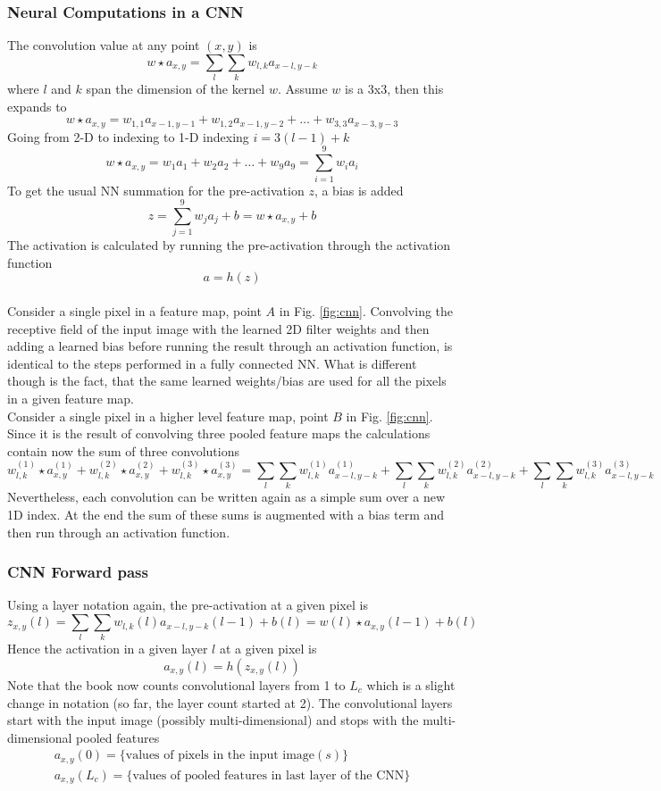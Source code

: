 \subsubsection{Neural Computations in a CNN}
The convolution value at any point $(x,y)$ is
\[
  w \star a_{x,y} = \sum_l \sum_k w_{l,k} a_{x-l,y-k}
\]
where $l$ and $k$ span the dimension of the kernel $w$.
Assume $w$ is a 3x3, then this expands to
\[
  w \star a_{x,y} = w_{1,1}a_{x-1,y-1} + w_{1,2}a_{x-1,y-2} + \ldots + w_{3,3}a_{x-3,y-3}
\]
Going from 2-D to indexing to 1-D indexing $i=3(l-1)+k$
\[
  w \star a_{x,y} = w_1a_1 + w_2a_2 + \ldots + w_9a_9 = \sum_{i=1}^{9} w_ia_i
\]
To get the usual NN summation for the pre-activation $z$, a bias is added
\[
  z = \sum_{j=1}^{9} w_ja_j + b = w \star a_{x,y} + b
\]
The activation is calculated by running the pre-activation through the activation function
\[
  a = h(z)
\]
\\

Consider a single pixel in a feature map, point $A$ in Fig. \ref{fig:cnn}.
Convolving the receptive field of the input image with the learned 2D filter weights and then adding a learned bias before running the result through an activation function, is identical to the steps performed in a fully connected NN.
What is different though is the fact, that the same learned weights/bias are used for all the pixels in a given feature map.\\

Consider a single pixel in a higher level feature map, point $B$ in Fig. \ref{fig:cnn}.
Since it is the result of convolving three pooled feature maps the calculations contain now the sum of three convolutions
\[
  w_{l,k}^{(1)} \star a_{x,y}^{(1)} + w_{l,k}^{(2)} \star a_{x,y}^{(2)} + w_{l,k}^{(3)} \star a_{x,y}^{(3)} = \sum_l \sum_k w_{l,k}^{(1)}a_{x-l,y-k}^{(1)} + \sum_l \sum_k w_{l,k}^{(2)}a_{x-l,y-k}^{(2)} + \sum_l \sum_k w_{l,k}^{(3)}a_{x-l,y-k}^{(3)}
\]
Nevertheless, each convolution can be written again as a simple sum over a new 1D index.
At the end the sum of these sums is augmented with a bias term and then run through an activation function.

\subsubsection{CNN Forward pass}
Using a layer notation again, the pre-activation at a given pixel is
\[
  z_{x,y}(l) = \sum_l \sum_k w_{l,k}(l) a_{x-l,y-k}(l-1) + b(l) = w(l) \star a_{x,y}(l-1) + b(l)
\]
Hence the activation in a given layer $l$ at a given pixel is
\[
  a_{x,y}(l) = h(z_{x,y}(l))
\]
Note that the book now counts convolutional layers from 1 to $L_c$ which is a slight change in notation (so far, the layer count started at 2).
The convolutional layers start with the input image (possibly multi-dimensional) and stops with the multi-dimensional pooled features
\begin{align*}
  a_{x,y}(0) = \{\text{values of pixels in the input image}(s)\} \\
  a_{x,y}(L_c) = \{\text{values of pooled features in last layer of the CNN}\}
\end{align*}

